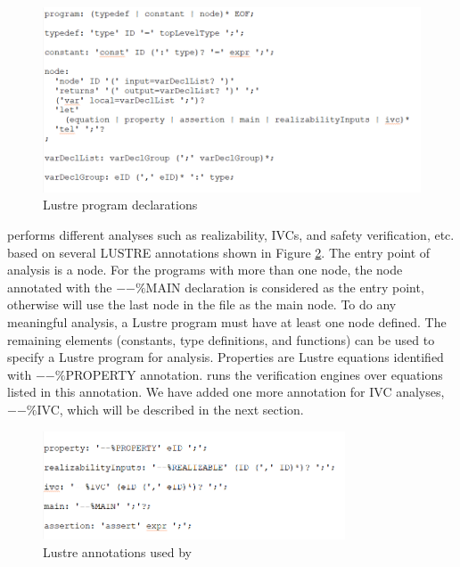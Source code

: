  \begin{figure}
 \centering
  \includegraphics[width=\textwidth]{figs/jk4.png}
  \caption{Lustre program declarations}
  \vspace{0.1in}
  \label{fig:jk4}
\end{figure}


\jkind performs different analyses such as realizability, IVCs, and safety verification, etc. based on several LUSTRE annotations shown in Figure \ref{fig:jk7}.  The entry point of \jkind analysis is a node. For the programs with more than one node,  the node annotated with the $-$$-\%$MAIN declaration is considered as the entry point, otherwise \jkind will use the last node in the file as the main node. To do any meaningful analysis, a Lustre program must have at least one node defined. The remaining elements (constants, type definitions, and functions) can be used to specify a Lustre program for analysis. Properties are Lustre equations identified with $-$$-\%$PROPERTY annotation. \jkind runs the verification engines over equations listed in this annotation. We have added one more annotation for IVC analyses, $-$$-\%$IVC, which will be described in the next section.

 \begin{figure}
 \centering
  \includegraphics[width=0.8\textwidth]{figs/jk7.png}
  \caption{Lustre annotations used by \jkind}
  \vspace{0.1in}
  \label{fig:jk7}
\end{figure}

